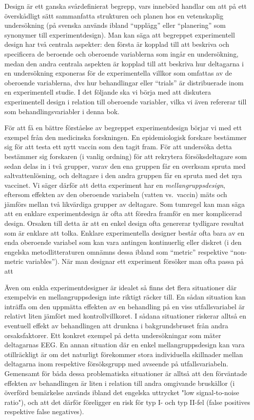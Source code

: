 \documentclass[
]{book}
\begin{document}
Design är ett ganska svårdefinierat begrepp, vars innebörd handlar om att på ett överskådligt sätt sammanfatta strukturen och planen hos en vetenskaplig undersökning (på svenska används ibland ``upplägg'' eller ``planering'' som synonymer till experimentdesign). Man kan säga att begreppet experimentell design har två centrala aspekter: den första är kopplad till att beskriva och specificera de beroende och oberoende variablerna som ingår en undersökning, medan den andra centrala aspekten är kopplad till att beskriva hur deltagarna i en undersökning exponeras för de experimentella villkor som omfattas av de oberoende variablerna, dvs hur behandlingar eller ``trials'' är distribuerade inom en experimentell studie. I det följande ska vi börja med att diskutera experimentell design i relation till oberoende variabler, vilka vi även refererar till som behandlingsvariabler i denna bok.

För att få en bättre förståelse av begreppet experimentdesign börjar vi med ett exempel från den medicinska forskningen. En epidemiologisk forskare bestämmer sig för att testa ett nytt vaccin som den tagit fram. För att undersöka detta bestämmer sig forskaren (i vanlig ordning) för att rekrytera försöksdeltagare som sedan delas in i två grupper, varav den ena gruppen får en overksam spruta med saltvattenlösning, och deltagare i den andra gruppen får en spruta med det nya vaccinet. Vi säger därför att detta experiment har en \emph{mellangruppsdesign}, eftersom effekten av den oberoende variabeln (vatten vs.~vaccin) mäts och jämförs mellan två likvärdiga grupper av deltagare. Som tumregel kan man säga att en enklare experimentdesign är ofta att föredra framför en mer komplicerad design. Orsaken till detta är att en enkel design ofta genererar tydligare resultat som är enklare att tolka. Enklare experimentella designer består ofta bara av en enda oberoende variabel som kan vara antingen kontinuerlig eller diskret (i den engelska metodlitteraturen omnämns dessa ibland som ``metric'' respektive ``non-metric variables''). När man designar ett experiment försöker man ofta passa på att

Även om enkla experimentdesigner är idealet så finns det flera situationer där exempelvis en mellangruppsdesign inte riktigt räcker till. En sådan situation kan inträffa om den uppmätta effekten av en behandling på en viss utfallsvariabel är relativt liten jämfört med kontrollvillkoret. I sådana situationer riskerar alltså en eventuell effekt av behandlingen att drunkna i bakgrundsbruset från andra orsaksfaktorer. Ett konkret exempel på detta undersökningar som mäter deltagarnas EEG. En annan situation där en enkel mellangruppsdesign kan vara otillräckligt är om det naturligt förekommer stora individuella skillnader mellan deltagarna inom respektive försöksgrupp med avseende på utfallsvariabeln. Gemensamt för båda dessa problematiska situationer är alltså att den förväntade effekten av behandlingen är liten i relation till andra omgivande bruskällor (i överförd bemärkelse används ibland det engelska uttrycket "low signal-to-noise ratio"), och att det därför föreligger en risk för typ I- och typ II-fel (false positives respektive false negatives).
\end{document}
